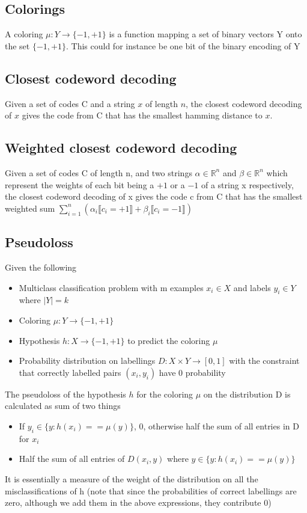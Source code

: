 \documentclass[11pt]{article}
\begin{document}
    \subsection{Colorings}
        A coloring $\mu : Y \rightarrow \{-1, +1\}$ is a function mapping a set of binary vectors Y onto the set $\{-1,+1\}$. This could for instance be one bit of the binary encoding of Y
    \subsection{Closest codeword decoding}
    Given a set of codes C and a string $x$ of length $n$, the closest codeword decoding of $x$ gives the code from C that has the smallest hamming distance to $x$.
    \subsection{Weighted closest codeword decoding}
    Given a set of codes C of length n, and two strings $\alpha \in \mathbb{R}^n$ and $\beta \in \mathbb{R}^n$ which represent the weights of each bit being a $+1$ or a $-1$ of a string x respectively, the closest codeword decoding of x gives the code c from C that has the smallest weighted sum $\sum_{i=1}^n (\alpha_i\llbracket c_i = +1 \rrbracket + \beta_i\llbracket c_i = -1 \rrbracket)$
    \subsection{Pseudoloss}
    Given the following
    \begin{itemize}
    \item Multiclass classification problem with m examples $x_i \in X$ and labels $y_i \in Y$ where $|Y| = k$
    \item Coloring $\mu : Y \rightarrow \{-1,+1\}$
    \item Hypothesis $h: X \rightarrow \{-1,+1\}$ to predict the coloring $\mu$
    \item Probability distribution on labellings $D : X \times Y \rightarrow [0,1]$ with the constraint that correctly labelled pairs $(x_i, y_i)$ have 0 probability
    \end{itemize}
    The pseudoloss of the hypothesis $h$ for the coloring $\mu$ on the distribution D is calculated as sum of two things
    \begin{itemize}
    \item If $y_i \in \{y : h(x_i) == \mu(y) \}$, 0, otherwise half the sum of all entries in D for $x_i$
    \item Half the sum of all entries of $D(x_i, y)$ where $y \in \{y : h(x_i) == \mu(y) \}$
    \end{itemize}
    It is essentially a measure of the weight of the distribution on
    all the misclassifications of h (note that since the probabilities of correct labellings are zero, although we add them in the above expressions, they contribute 0)
\end{document}
